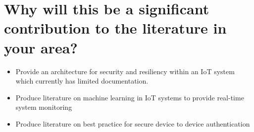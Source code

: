 \documentclass[../main.tex]{subfiles}
\begin{document}
\section{Why will this be a significant contribution to the literature in your area?}

\begin{itemize}
    \item Provide an architecture for security and resiliency within an IoT system which currently has limited documentation.
    \item Produce literature on machine learning in IoT systems to provide real-time system monitoring
    \item Produce literature on best practice for secure device to device authentication
\end{itemize}
\end{document}
